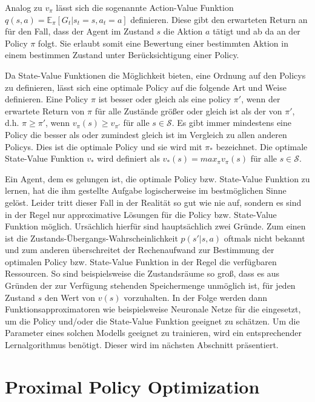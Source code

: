 Analog zu $v_\pi$ lässt sich die sogenannte Action-Value Funktion $q(s,a) = \mathbb{E}_\pi[G_t | s_t=s, a_t=a]$ definieren. Diese gibt den erwarteten Return an für den Fall, dass der Agent im Zustand $s$ die Aktion $a$ tätigt und ab da an der Policy $\pi$ folgt. Sie erlaubt somit eine Bewertung einer bestimmten Aktion in einem bestimmen Zustand unter Berücksichtigung einer Policy.

Da State-Value Funktionen die Möglichkeit bieten, eine Ordnung auf den Policys zu definieren, lässt sich eine optimale Policy auf die folgende Art und Weise definieren. Eine Policy $\pi$ ist besser oder gleich als eine policy $\pi'$, wenn der erwartete Return von $\pi$ für alle Zustände größer oder gleich ist als der von $\pi'$, d.h. $\pi \ge \pi'$, wenn $v_\pi(s) \ge v_{\pi'}$ für alle $s \in \mathcal{S}$. Es gibt immer mindestens eine Policy die besser als oder zumindest gleich ist im Vergleich zu allen anderen Policys. Dies ist die optimale Policy und sie wird mit $\pi_*$ bezeichnet. Die optimale State-Value Funktion $v_*$ wird definiert als $v_*(s) = max_\pi v_\pi(s)$ für alle $s \in \mathcal{S}$.

Ein Agent, dem es gelungen ist, die optimale Policy bzw. State-Value Funktion zu lernen, hat die ihm gestellte Aufgabe logischerweise im bestmöglichen Sinne gelöst. Leider tritt dieser Fall in der Realität so gut wie nie auf, sondern es sind in der Regel nur approximative Lösungen für die Policy bzw. State-Value Funktion möglich. Ursächlich hierfür sind hauptsächlich zwei Gründe. Zum einen ist die Zustands-Übergangs-Wahrscheinlichkeit $p(s'|s,a)$ oftmals nicht bekannt und zum anderen überschreitet der Rechenaufwand zur Bestimmung der optimalen Policy bzw. State-Value Funktion in der Regel die verfügbaren Ressourcen. So sind beispielsweise die Zustandsräume so groß, dass es aus Gründen der zur Verfügung stehenden Speichermenge unmöglich ist, für jeden Zustand $s$ den Wert von $v(s)$ vorzuhalten. In der Folge werden dann Funktionsapproximatoren wie beispielsweise Neuronale Netze für die eingesetzt, um die Policy und/oder die State-Value Funktion geeignet zu schätzen. Um die Parameter eines solchen Modells geeignet zu trainieren, wird ein entsprechender Lernalgorithmus benötigt. Dieser wird im nächsten Abschnitt präsentiert.


\section{Proximal Policy Optimization}
\label{sec_ppo}

